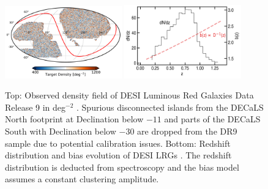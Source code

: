 \begin{figure}
    \centering
    \includegraphics[width=0.45\textwidth]{figures/lrgdens.pdf}
    \includegraphics[width=0.45\textwidth]{figures/nz_lrg.pdf}
    \caption{Top: Observed density field of DESI Luminous Red Galaxies Data Release 9  in deg$^{-2}$ . Spurious disconnected islands from the DECaLS North footprint at Declination below $-11$ and parts of the DECaLS South with Declination below $-30$ are dropped from the DR9 sample due to potential calibration issues. Bottom: Redshift distribution and bias evolution of DESI LRGs . The redshift distribution is deducted from spectroscopy and the bias model assumes a constant clustering amplitude.}
    \label{fig:ng}
\end{figure}


